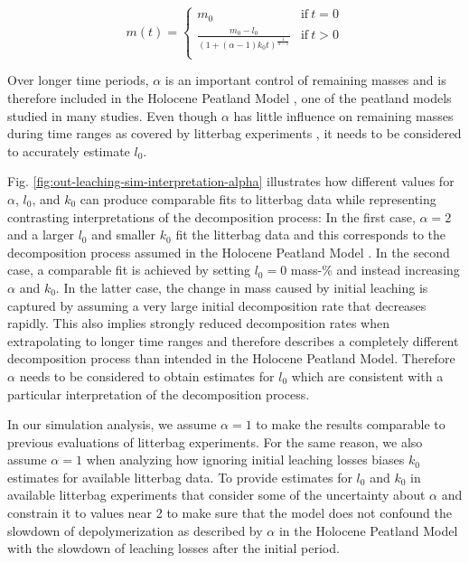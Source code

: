 \documentclass[bg, manuscript]{copernicus}
\begin{document}
\begin{equation}
m(t) = \begin{cases}
m_0 & \mathrm{if}~t=0\\
\frac{m_0 - l_0}{(1 + (\alpha - 1) k_0 t)^{\frac{1}{\alpha - 1}}} & \mathrm{if}~t>0\\
\end{cases}
\label{eq:decomposition-solution-2-with-leaching-1}
\end{equation}

Over longer time periods, \(\alpha\) is an important control of remaining masses \citep{Frolking.2001} and is therefore included in the Holocene Peatland Model \citep{Frolking.2010}, one of the peatland models studied in many studies. Even though \(\alpha\) has little influence on remaining masses during time ranges as covered by litterbag experiments \citep{Frolking.2001, Frolking.2010}, it needs to be considered to accurately estimate \(l_0\).

Fig. \ref{fig:out-leaching-sim-interpretation-alpha} illustrates how different values for \(\alpha\), \(l_0\), and \(k_0\) can produce comparable fits to litterbag data while representing contrasting interpretations of the decomposition process: In the first case, \(\alpha=2\) and a larger \(l_0\) and smaller \(k_0\) fit the litterbag data and this corresponds to the decomposition process assumed in the Holocene Peatland Model \citep{Frolking.2010}. In the second case, a comparable fit is achieved by setting \(l_0=0\) mass-\% and instead increasing \(\alpha\) and \(k_0\). In the latter case, the change in mass caused by initial leaching is captured by assuming a very large initial decomposition rate that decreases rapidly. This also implies strongly reduced decomposition rates when extrapolating to longer time ranges and therefore describes a completely different decomposition process than intended in the Holocene Peatland Model. Therefore \(\alpha\) needs to be considered to obtain estimates for \(l_0\) which are consistent with a particular interpretation of the decomposition process.

In our simulation analysis, we assume \(\alpha = 1\) to make the results comparable to previous evaluations of litterbag experiments. For the same reason, we also assume \(\alpha = 1\) when analyzing how ignoring initial leaching losses biases \(k_0\) estimates for available litterbag data. To provide estimates for \(l_0\) and \(k_0\) in available litterbag experiments that consider some of the uncertainty about \(\alpha\) and constrain it to values near 2 to make sure that the model does not confound the slowdown of depolymerization as described by \(\alpha\) in the Holocene Peatland Model with the slowdown of leaching losses after the initial period.
\end{document}
